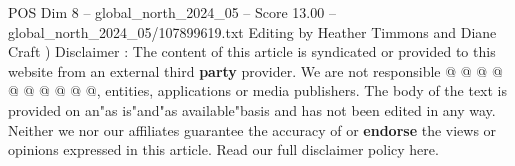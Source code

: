 \begin{textsample}{POS Dim 8 – global\_north\_2024\_05 – Score 13.00 – global\_north\_2024\_05/107899619.txt}
Editing by Heather Timmons and Diane Craft ) Disclaimer : The content of this article is syndicated or provided to this website from an external third \textbf{party} provider.
We are not responsible @ @ @ @ @ @ @ @ @ @, entities, applications or media publishers.
The body of the text is provided on an"as is"and"as available"basis and has not been edited in any way.
Neither we nor our affiliates guarantee the accuracy of or \textbf{endorse} the views or opinions expressed in this article.
Read our full disclaimer policy here.

\end{textsample}
